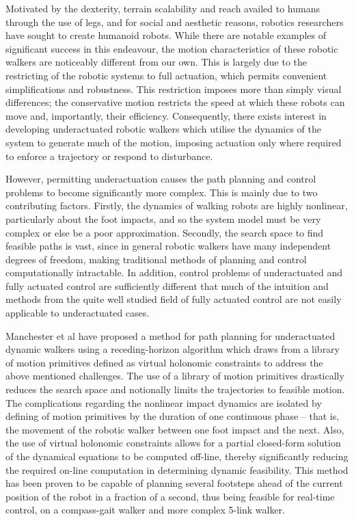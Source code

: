 Motivated by the dexterity, terrain scalability and reach availed to humans through the use of legs, and for social and aesthetic reasons, robotics researchers have sought to create humanoid robots. While there are notable examples of significant success in this endeavour, the motion characteristics of these robotic walkers are noticeably different from our own. This is largely due to the restricting of the robotic systems to full actuation, which permits convenient simplifications and robustness. This restriction imposes more than simply visual differences; the conservative motion restricts the speed at which these robots can move and, importantly, their efficiency. Consequently, there exists interest in developing underactuated robotic walkers which utilise the dynamics of the system to generate much of the motion, imposing actuation only where required to enforce a trajectory or respond to disturbance.

However, permitting underactuation causes the path planning and control problems to become significantly more complex. This is mainly due to two contributing factors. Firstly, the dynamics of walking robots are highly nonlinear, particularly about the foot impacts, and so the system model must be very complex or else be a poor approximation. Secondly, the search space to find feasible paths is vast, since in general robotic walkers have many independent degrees of freedom, making traditional methods of planning and control computationally intractable. In addition, control problems of underactuated and fully actuated control are sufficiently different that much of the intuition and methods from the quite well studied field of fully actuated control are not easily applicable to underactuated cases.

Manchester et al \cite{manchester13planning} have proposed a method for path planning for underactuated dynamic walkers using a receding-horizon algorithm which draws from a library of motion primitives defined as virtual holonomic constraints to address the above mentioned challenges. The use of a library of motion primitives drastically reduces the search space and notionally limits the trajectories to feasible motion. The complications regarding the nonlinear impact dynamics are isolated by defining of motion primitives by the duration of one continuous phase – that is, the movement of the robotic walker between one foot impact and the next. Also, the use of virtual holonomic constraints allows for a partial closed-form solution of the dynamical equations to be computed off-line, thereby significantly reducing the required on-line computation in determining dynamic feasibility. This method has been proven to be capable of planning several footsteps ahead of the current position of the robot in a fraction of a second, thus being feasible for real-time control, on a compass-gait walker and more complex 5-link walker.

